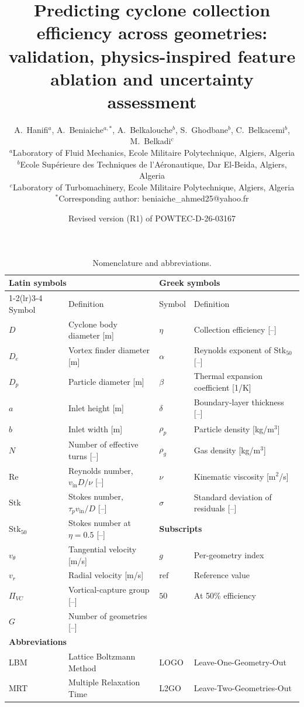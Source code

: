 \documentclass[12pt]{article}
\title{Predicting cyclone collection efficiency across geometries: \\
validation, physics-inspired feature ablation and uncertainty assessment}
\author{A.~Hanifi$^{a}$, A.~Beniaiche$^{a,*}$, A.~Belkalouche$^{b}$, S.~Ghodbane$^{b}$, C.~Belkacemi$^{b}$, M.~Belkadi$^{c}$\\[2pt]
{\small $^a$Laboratory of Fluid Mechanics, Ecole Militaire Polytechnique, Algiers, Algeria}\\
{\small $^b$Ecole Sup\'erieure des Techniques de l'A\'eronautique, Dar El-Beida, Algiers, Algeria}\\
{\small $^c$Laboratory of Turbomachinery, Ecole Militaire Polytechnique, Algiers, Algeria}\\
{\small $^*$Corresponding author: beniaiche\_ahmed25@yahoo.fr}}
\date{Revised version (R1) of POWTEC-D-26-03167}
\newcommand{\Stk}{\mathrm{Stk}}
\newcommand{\Rey}{\mathrm{Re}}
\newcommand{\PiVC}{\Pi_{VC}}
\begin{document}
\maketitle

\begin{table}[!ht]\centering
\caption{Nomenclature and abbreviations.}\label{tab:nomenclature}
\small
\begin{tabular}{llll}
\toprule
\multicolumn{2}{l}{\textbf{Latin symbols}} & \multicolumn{2}{l}{\textbf{Greek symbols}} \\
\cmidrule(lr){1-2}\cmidrule(lr){3-4}
Symbol & Definition & Symbol & Definition \\
\midrule
$D$ & Cyclone body diameter [m] & $\eta$ & Collection efficiency [--] \\
$D_e$ & Vortex finder diameter [m] & $\alpha$ & Reynolds exponent of Stk$_{50}$ [--] \\
$D_p$ & Particle diameter [m] & $\beta$ & Thermal expansion coefficient [1/K] \\
$a$ & Inlet height [m] & $\delta$ & Boundary-layer thickness [--] \\
$b$ & Inlet width [m] & $\rho_p$ & Particle density [kg/m$^3$] \\
$N$ & Number of effective turns [--] & $\rho_g$ & Gas density [kg/m$^3$] \\
$\Rey$ & Reynolds number, $v_\text{in}D/\nu$ [--] & $\nu$ & Kinematic viscosity [m$^2$/s] \\
$\Stk$ & Stokes number, $\tau_p v_\text{in}/D$ [--] & $\sigma$ & Standard deviation of residuals [--] \\
$\Stk_{50}$ & Stokes number at $\eta=0.5$ [--] & \multicolumn{2}{l}{\textbf{Subscripts}} \\
$v_\theta$ & Tangential velocity [m/s] & $g$ & Per-geometry index \\
$v_r$ & Radial velocity [m/s] & $\text{ref}$ & Reference value \\
$\PiVC$ & Vortical-capture group [--] & $50$ & At 50\% efficiency \\
$G$ & Number of geometries [--] & & \\
\midrule
\multicolumn{4}{l}{\textbf{Abbreviations}} \\
\midrule
LBM & Lattice Boltzmann Method & LOGO & Leave-One-Geometry-Out \\
MRT & Multiple Relaxation Time & L2GO & Leave-Two-Geometries-Out \\

\end{tabular}
\end{table}
\end{document}
